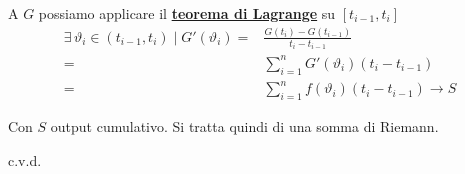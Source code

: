 \documentclass[../../dimostrazioni]{subfiles}
\begin{document}
                A \(G\) possiamo applicare il \textbf{\hyperref[teoLagrange]{teorema di Lagrange}} su \([t_{i-1}, t_i]\)
                \begin{align*}
                    \exists \, \vartheta_i \in (t_{i-1}, t_i) \mid G'(\vartheta_i) =& \frac{G(t_i) - G(t_{i-1})}{t_i - t_{i-1}} \\
                    =& \sum_{i=1}^{n} G'(\vartheta_i)(t_i - t_{i-1}) \\
                    =& \sum_{i=1}^{n} f(\vartheta_i)(t_i - t_{i-1}) \longrightarrow S
                \end{align*}

                Con \(S\) output cumulativo. Si tratta quindi di una somma di Riemann.

                \medskip
                
                c.v.d.
    
\end{document}
